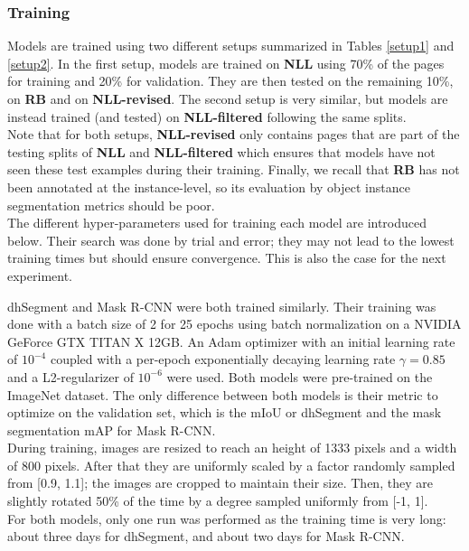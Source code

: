 \subsubsection{Training}
Models are trained using two different setups summarized in Tables \ref{setup1} and \ref{setup2}. In the first setup, models are trained on \textbf{NLL} using 70\% of the pages for training and 20\% for validation. They are then tested on the remaining 10\%, on \textbf{RB} and on \textbf{NLL-revised}. The second setup is very similar, but models are instead trained (and tested) on \textbf{NLL-filtered} following the same splits.\\
Note that for both setups, \textbf{NLL-revised} only contains pages that are part of the testing splits of \textbf{NLL} and \textbf{NLL-filtered} which ensures that models have not seen these test examples during their training. Finally, we recall that \textbf{RB} has not been annotated at the instance-level, so its evaluation by object instance segmentation metrics should be poor.\\
The different hyper-parameters used for training each model are introduced below. Their search was done by trial and error; they may not lead to the lowest training times but should ensure convergence. This is also the case for the next experiment.

dhSegment and Mask R-CNN were both trained similarly. Their training was done with a batch size of 2 for 25 epochs using batch normalization on a NVIDIA GeForce GTX TITAN X 12GB. An Adam optimizer with an initial learning rate of $10^{-4}$ coupled with a per-epoch exponentially decaying learning rate $\gamma=0.85$ and a L2-regularizer of $10^{-6}$ were used. Both models were pre-trained on the ImageNet dataset. The only difference between both models is their metric to optimize on the validation set, which is the mIoU or dhSegment and the mask segmentation mAP for Mask R-CNN. \\
During training, images are resized to reach an height of 1333 pixels and a width of 800 pixels. After that they are uniformly scaled by a factor randomly sampled from [0.9, 1.1]; the images are cropped to maintain their size. Then, they are slightly rotated 50\% of the time by a degree sampled uniformly from [-1, 1].  \\

For both models, only one run was performed as the training time is very long: about three days for dhSegment, and about two days for Mask R-CNN.


